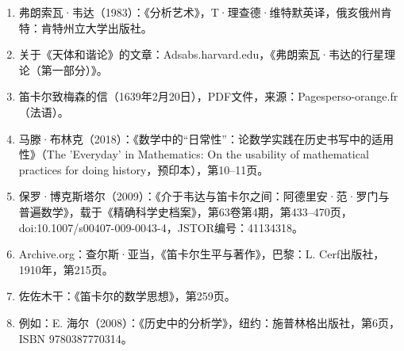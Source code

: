 \begin{enumerate}
\item 弗朗索瓦·韦达（1983）：《分析艺术》，T·理查德·维特默英译，俄亥俄州肯特：肯特州立大学出版社。
\item 关于《天体和谐论》的文章：Adsabs.harvard.edu，《弗朗索瓦·韦达的行星理论（第一部分）》。
\item 笛卡尔致梅森的信（1639年2月20日），PDF文件，来源：Pagesperso-orange.fr（法语）。
\item 马滕·布林克（2018）：《数学中的“日常性”：论数学实践在历史书写中的适用性》（The 'Everyday' in Mathematics: On the usability of mathematical practices for doing history，预印本），第10–11页。
\item 保罗·博克斯塔尔（2009）：《介于韦达与笛卡尔之间：阿德里安·范·罗门与普遍数学》，载于《精确科学史档案》，第63卷第4期，第433–470页，doi:10.1007/s00407-009-0043-4，JSTOR编号：41134318。
\item Archive.org：查尔斯·亚当，《笛卡尔生平与著作》，巴黎：L. Cerf出版社，1910年，第215页。
\item 佐佐木干：《笛卡尔的数学思想》，第259页。
\item 例如：E. 海尔（2008）：《历史中的分析学》，纽约：施普林格出版社，第6页，ISBN 9780387770314。
\end{enumerate}
